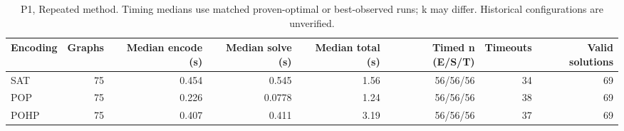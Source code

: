 \begin{table}[htbp]
\centering
\small
\caption{P1, Repeated method. Timing medians use matched proven-optimal or best-observed runs; k may differ. Historical configurations are unverified.}
\label{tab:encoding-runtime}
\begin{tabular}{lrrrrrrr}
\hline
Encoding & Graphs & Median encode (s) & Median solve (s) & Median total (s) & Timed n (E/S/T) & Timeouts & Valid solutions \\
\hline
SAT & 75 & 0.454 & 0.545 & 1.56 & 56/56/56 & 34 & 69 \\
POP & 75 & 0.226 & 0.0778 & 1.24 & 56/56/56 & 38 & 69 \\
POHP & 75 & 0.407 & 0.411 & 3.19 & 56/56/56 & 37 & 69 \\
\hline
\end{tabular}
\end{table}
